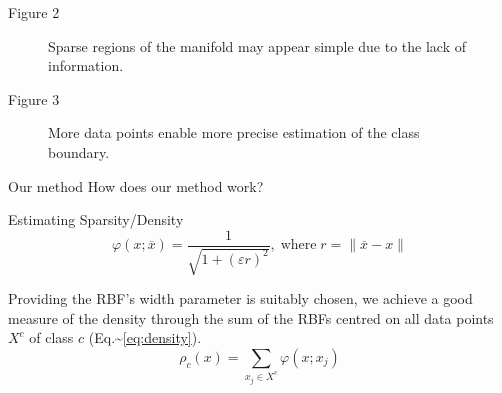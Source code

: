 \documentclass[smaller]{beamer}
\begin{document}
\begin{frame}[label={sec:org83b4835}]{Figure 2}
\begin{figure}
    \centering
    \caption{Sparse regions of the manifold may appear simple due to the lack of information.}
    \label{fig:density_a}
\end{figure}
\end{frame}


\begin{frame}[label={sec:orgb0e0e40}]{Figure 3}
\begin{figure}
    \centering
    \caption{More data points enable more precise estimation of the class boundary.}
    \label{fig:density_b}
\end{figure}
\end{frame}





\begin{frame}[label={sec:orgf9f6557}]{Our method}
How does our method work?
\end{frame}

\begin{frame}[label={sec:org4872e96}]{Estimating Sparsity/Density}
\begin{equation}
    \varphi(x; \overline{x}) =  \frac{1}{\sqrt{1 + (\varepsilon r)^2}},\; \text{where}\; r = \parallel \overline{x} - x \parallel
    \label{eq:rbf}
\end{equation}


Providing the RBF's width parameter is suitably chosen, we achieve a good measure of the density through the sum of the RBFs centred on all data points \(X^c\) of class \(c\) (Eq.\textasciitilde{}\ref{eq:density}).
\begin{equation}
    \rho_c(x) = \sum_{x_j \in X^c} \varphi(x; x_j)
    \label{eq:density}
\end{equation}
\end{frame}
\end{document}
